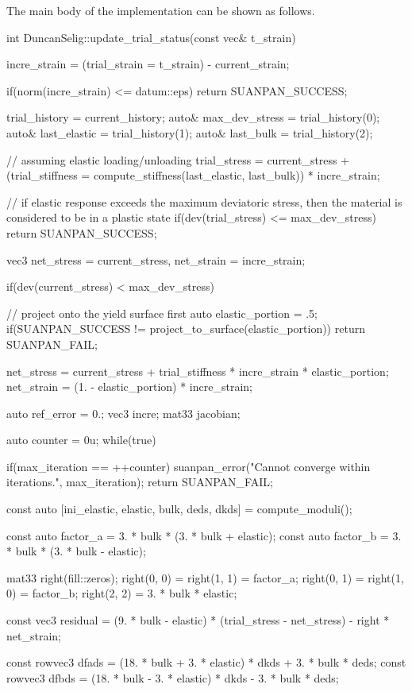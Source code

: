 The main body of the implementation can be shown as follows.
\begin{cppcode}
int DuncanSelig::update_trial_status(const vec& t_strain) {
    incre_strain = (trial_strain = t_strain) - current_strain;

    if(norm(incre_strain) <= datum::eps) return SUANPAN_SUCCESS;

    trial_history = current_history;
    auto& max_dev_stress = trial_history(0);
    auto& last_elastic = trial_history(1);
    auto& last_bulk = trial_history(2);

    // assuming elastic loading/unloading
    trial_stress = current_stress + (trial_stiffness = compute_stiffness(last_elastic, last_bulk)) * incre_strain;

    // if elastic response exceeds the maximum deviatoric stress, then the material is considered to be in a plastic state
    if(dev(trial_stress) <= max_dev_stress) return SUANPAN_SUCCESS;

    vec3 net_stress = current_stress, net_strain = incre_strain;

    if(dev(current_stress) < max_dev_stress) {
        // project onto the yield surface first
        auto elastic_portion = .5;
        if(SUANPAN_SUCCESS != project_to_surface(elastic_portion)) return SUANPAN_FAIL;

        net_stress = current_stress + trial_stiffness * incre_strain * elastic_portion;
        net_strain = (1. - elastic_portion) * incre_strain;
    }

    auto ref_error = 0.;
    vec3 incre;
    mat33 jacobian;

    auto counter = 0u;
    while(true) {
        if(max_iteration == ++counter) {
            suanpan_error("Cannot converge within {} iterations.\n", max_iteration);
            return SUANPAN_FAIL;
        }

        const auto [ini_elastic, elastic, bulk, deds, dkds] = compute_moduli();

        const auto factor_a = 3. * bulk * (3. * bulk + elastic);
        const auto factor_b = 3. * bulk * (3. * bulk - elastic);

        mat33 right(fill::zeros);
        right(0, 0) = right(1, 1) = factor_a;
        right(0, 1) = right(1, 0) = factor_b;
        right(2, 2) = 3. * bulk * elastic;

        const vec3 residual = (9. * bulk - elastic) * (trial_stress - net_stress) - right * net_strain;

        const rowvec3 dfads = (18. * bulk + 3. * elastic) * dkds + 3. * bulk * deds;
        const rowvec3 dfbds = (18. * bulk - 3. * elastic) * dkds - 3. * bulk * deds;

}}
\end{cppcode}
